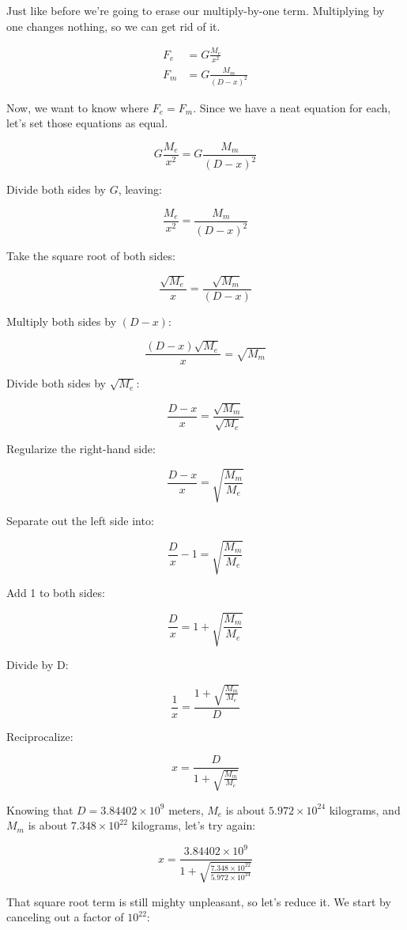 \documentclass[10pt,twocolumn,letterpaper,preprint]{article}
\begin{document}
Just like before we're going to erase our multiply-by-one term.  Multiplying by
one changes nothing, so we can get rid of it.

\begin{align*}
F_{e} &= G\frac{M_{e}}{x^2}\\
F_{m} &= G\frac{M_{m}}{(D-x)^2}
\end{align*}

Now, we want to know where $F_e = F_m$.  Since we have a neat equation for each,
let's set those equations as equal.

\[
G\frac{M_e}{x^2} = G\frac{M_m}{(D-x)^2}
\]

Divide both sides by $G$, leaving:

\[
\frac{M_e}{x^2} = \frac{M_m}{(D-x)^2}
\]

Take the square root of both sides:

\[
\frac{\sqrt{M_e}}{x} = \frac{\sqrt{M_m}}{(D-x)}
\]

Multiply both sides by $(D-x)$:

\[
\frac{(D-x)\sqrt{M_e}}{x} = \sqrt{M_m}
\]

Divide both sides by $\sqrt{M_e}$:

\[
\frac{D-x}{x} = \frac{\sqrt{M_m}}{\sqrt{M_e}}
\]

Regularize the right-hand side:

\[
\frac{D-x}{x} = \sqrt{\frac{M_m}{M_e}}
\]

Separate out the left side into:

\[
\frac{D}{x} - 1 = \sqrt{\frac{M_m}{M_e}}
\]

Add 1 to both sides:

\[
\frac{D}{x} = 1 + \sqrt{\frac{M_m}{M_e}}
\]

Divide by D:

\[
\frac{1}{x} = \frac{1 + \sqrt{\frac{M_m}{M_e}}}{D}
\]

Reciprocalize:

\[
x = \frac{D}{1 + \sqrt{\frac{M_m}{M_e}}}
\]

Knowing that $D = 3.84402 \times 10^{9}$ meters, $M_e$ is about
$5.972 \times 10^{24}$ kilograms, and $M_m$ is about $7.348 \times
10^{22}$ kilograms, let's try again:

\[
x = \frac{3.84402 \times 10^9}{1 + \sqrt{\frac{7.348 \times
10^{22}}{5.972 \times 10^{24}}}}
\]

That square root term is still mighty unpleasant, so let's reduce it.
We start by canceling out a factor of $10^{22}$:
\end{document}
